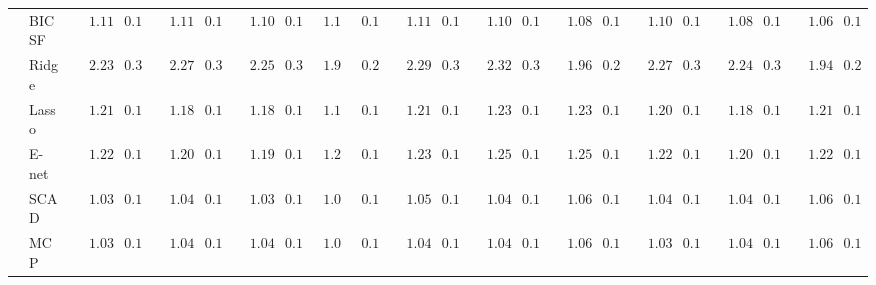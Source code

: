 \begin{tabular}{ll|ll|llllll|llllll|llllll}
 & BIC SF  & $\phantom{00}1.11$ & $\phantom{0}0.13$ & $\phantom{00}1.11$ & $\phantom{0}0.14$ & $\phantom{00}1.10$ & $\phantom{0}0.14$ & $\phantom{0}1.11$ & $\phantom{0}0.14$ & $\phantom{00}1.11$ & $\phantom{0}0.13$ & $\phantom{00}1.10$ & $\phantom{0}0.12$ & $\phantom{00}1.08$ & $\phantom{0}0.15$ & $\phantom{00}1.10$ & $\phantom{0}0.13$ & $\phantom{00}1.08$ & $\phantom{0}0.12$ & $\phantom{00}1.06$ & $\phantom{0}0.12$ \\
 & Ridge  & $\phantom{00}2.23$ & $\phantom{0}0.38$ & $\phantom{00}2.27$ & $\phantom{0}0.35$ & $\phantom{00}2.25$ & $\phantom{0}0.35$ & $\phantom{0}1.91$ & $\phantom{0}0.22$ & $\phantom{00}2.29$ & $\phantom{0}0.37$ & $\phantom{00}2.32$ & $\phantom{0}0.33$ & $\phantom{00}1.96$ & $\phantom{0}0.24$ & $\phantom{00}2.27$ & $\phantom{0}0.36$ & $\phantom{00}2.24$ & $\phantom{0}0.32$ & $\phantom{00}1.94$ & $\phantom{0}0.24$ \\
 & Lasso  & $\phantom{00}1.21$ & $\phantom{0}0.16$ & $\phantom{00}1.18$ & $\phantom{0}0.12$ & $\phantom{00}1.18$ & $\phantom{0}0.15$ & $\phantom{0}1.18$ & $\phantom{0}0.13$ & $\phantom{00}1.21$ & $\phantom{0}0.17$ & $\phantom{00}1.23$ & $\phantom{0}0.15$ & $\phantom{00}1.23$ & $\phantom{0}0.15$ & $\phantom{00}1.20$ & $\phantom{0}0.14$ & $\phantom{00}1.18$ & $\phantom{0}0.15$ & $\phantom{00}1.21$ & $\phantom{0}0.16$ \\
 & E-net  & $\phantom{00}1.22$ & $\phantom{0}0.17$ & $\phantom{00}1.20$ & $\phantom{0}0.13$ & $\phantom{00}1.19$ & $\phantom{0}0.15$ & $\phantom{0}1.20$ & $\phantom{0}0.13$ & $\phantom{00}1.23$ & $\phantom{0}0.17$ & $\phantom{00}1.25$ & $\phantom{0}0.15$ & $\phantom{00}1.25$ & $\phantom{0}0.15$ & $\phantom{00}1.22$ & $\phantom{0}0.14$ & $\phantom{00}1.20$ & $\phantom{0}0.15$ & $\phantom{00}1.22$ & $\phantom{0}0.16$ \\
 & SCAD  & $\phantom{00}1.03$ & $\phantom{0}0.12$ & $\phantom{00}1.04$ & $\phantom{0}0.11$ & $\phantom{00}1.03$ & $\phantom{0}0.11$ & $\phantom{0}1.05$ & $\phantom{0}0.12$ & $\phantom{00}1.05$ & $\phantom{0}0.11$ & $\phantom{00}1.04$ & $\phantom{0}0.11$ & $\phantom{00}1.06$ & $\phantom{0}0.11$ & $\phantom{00}1.04$ & $\phantom{0}0.11$ & $\phantom{00}1.04$ & $\phantom{0}0.12$ & $\phantom{00}1.06$ & $\phantom{0}0.11$ \\
 & MCP  & $\phantom{00}1.03$ & $\phantom{0}0.12$ & $\phantom{00}1.04$ & $\phantom{0}0.11$ & $\phantom{00}1.04$ & $\phantom{0}0.12$ & $\phantom{0}1.05$ & $\phantom{0}0.12$ & $\phantom{00}1.04$ & $\phantom{0}0.11$ & $\phantom{00}1.04$ & $\phantom{0}0.11$ & $\phantom{00}1.06$ & $\phantom{0}0.11$ & $\phantom{00}1.03$ & $\phantom{0}0.11$ & $\phantom{00}1.04$ & $\phantom{0}0.12$ & $\phantom{00}1.06$ & $\phantom{0}0.12$ \\

\end{tabular}
